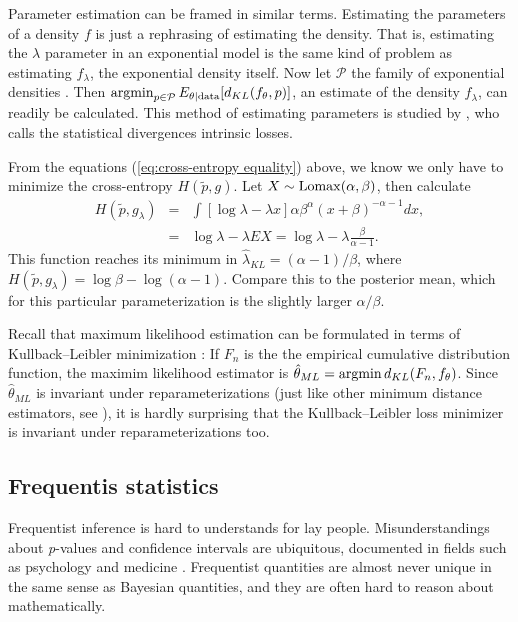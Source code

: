 \begin{example}
Parameter estimation can be framed in similar terms. Estimating the
parameters of a density $f$ is just a rephrasing of estimating the
density. That is, estimating the $\lambda$ parameter in an
exponential model is the same kind of problem as estimating $f_{\lambda}$,
the exponential density itself. Now let $\mathcal{P}$ the family
of exponential densities . Then $\operatorname{argmin}_{p\in\mathcal{P}}E_{\theta\mid\textrm{data}}[d_{KL}(f_{\theta},p)]$,
an estimate of the density $f_{\lambda}$, can readily be calculated.
This method of estimating parameters is studied by \textcite{Robert1996-ii},
who calls the statistical divergences intrinsic losses. 

From the equations (\ref{eq:cross-entropy equality}) above, we know
we only have to minimize the cross-entropy $H(\tilde{p},g)$. Let
$X\sim\operatorname{Lomax}(\alpha,\beta)$, then calculate
\begin{eqnarray*}
H(\tilde{p},g_{\lambda}) & = & \int[\log\lambda-\lambda x]\alpha\beta^{\alpha}(x+\beta)^{-\alpha-1}dx,\\
 & = & \log\lambda-\lambda EX=\log\lambda-\lambda\frac{\beta}{\alpha-1}.
\end{eqnarray*}
This function reaches its minimum in $\hat{\lambda}_{KL}=(\alpha-1)/\beta$,
where $H(\tilde{p},g_{\lambda})=\log\beta-\log(\alpha-1)$. Compare
this to the posterior mean, which for this particular parameterization
is the slightly larger $\alpha/\beta$. 

Recall that maximum likelihood estimation can be formulated in terms
of Kullback--Leibler minimization \parencite[p. 25]{Claeskens2008-hk}:
If $F_{n}$ is the the empirical cumulative distribution function,
the maximim likelihood estimator is $\hat{\theta}_{ML}=\operatorname{argmin} d_{KL}(F_{n},f_{\theta})$.
Since $\hat{\theta}_{ML}$ is invariant under reparameterizations
(just like other minimum distance estimators, see \textcite{Drossos1980-ar}),
it is hardly surprising that the Kullback--Leibler loss minimizer
is invariant under reparameterizations too. 
\end{example}


\subsection{Frequentis statistics}

Frequentist inference is hard to understands for lay people. Misunderstandings
about \emph{p}-values and confidence intervals are ubiquitous, documented
in fields such as psychology \parencite{Belia2005-di,Gigerenzer2018-oi}
and medicine \parencite{Goodman2008-ed,Gigerenzer2007-qi}. Frequentist quantities are almost never unique in the same
sense as Bayesian quantities, and they are often hard to reason about
mathematically. 

